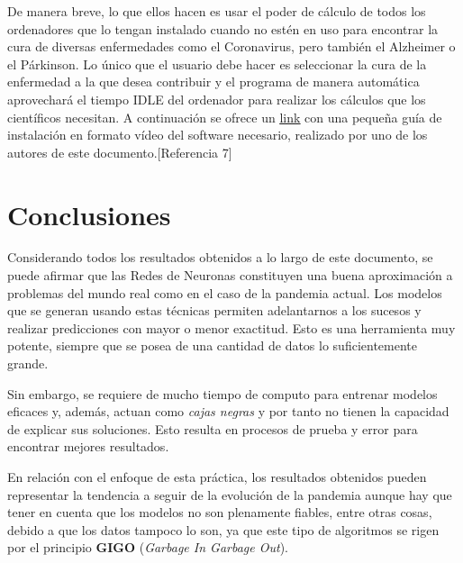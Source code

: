 \documentclass[12pt,a4paper, xcolor=table]{article}
\begin{document}
      \vspace{2mm}

      De manera breve, lo que ellos hacen es usar el poder de cálculo de todos los ordenadores que lo tengan instalado cuando no estén en uso para encontrar la cura de diversas enfermedades como el Coronavirus, pero también el Alzheimer o el Párkinson. Lo único que el usuario debe hacer es seleccionar la cura de la enfermedad a la que desea contribuir y el programa de manera automática aprovechará el tiempo IDLE del ordenador para realizar los cálculos que los científicos necesitan. A continuación se ofrece un  \href{https://www.youtube.com/watch?v=xqvAHnac79U}{\underline{link}} con una pequeña guía de instalación en formato vídeo del software necesario, realizado por uno de los autores de este documento.[Referencia 7]



      \newpage

    \section{Conclusiones}

    Considerando todos los resultados obtenidos a lo largo de este documento, se puede afirmar que las Redes de Neuronas constituyen una buena aproximación a problemas del mundo real como en el caso de la pandemia actual. Los modelos que se generan usando estas técnicas permiten adelantarnos a los sucesos y realizar predicciones con mayor o menor exactitud. Esto es una herramienta muy potente, siempre que se posea de una cantidad de datos lo suficientemente grande.

    \vspace{2mm}

    Sin embargo, se requiere de mucho tiempo de computo para entrenar modelos eficaces y, además, actuan como \textit{cajas negras} y por tanto no tienen la capacidad de explicar sus soluciones. Esto resulta en procesos de prueba y error para encontrar mejores resultados.

    \vspace{2mm}

    En relación con el enfoque de esta práctica, los resultados obtenidos pueden representar la tendencia a seguir de la evolución de la pandemia aunque hay que tener en cuenta que los modelos no son plenamente fiables, entre otras cosas, debido a que los datos tampoco lo son, ya que este tipo de algoritmos se rigen por el principio \textbf{GIGO} (\textit{Garbage In Garbage Out}).
\end{document}
